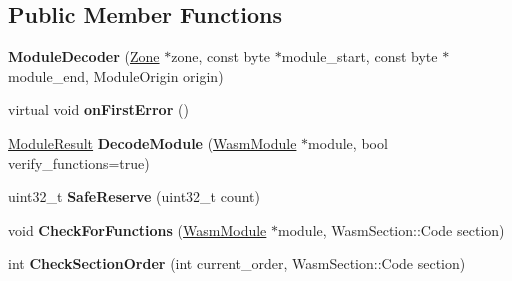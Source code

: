 \subsection*{Public Member Functions}
\begin{DoxyCompactItemize}
\item 
{\bfseries Module\+Decoder} (\hyperlink{classv8_1_1internal_1_1_zone}{Zone} $\ast$zone, const byte $\ast$module\+\_\+start, const byte $\ast$module\+\_\+end, Module\+Origin origin)\hypertarget{classv8_1_1internal_1_1wasm_1_1_module_decoder_aed4f8b1010871b48585bbaae846f55d2}{}\label{classv8_1_1internal_1_1wasm_1_1_module_decoder_aed4f8b1010871b48585bbaae846f55d2}

\item 
virtual void {\bfseries on\+First\+Error} ()\hypertarget{classv8_1_1internal_1_1wasm_1_1_module_decoder_a903485aca0a570104d4681b8f0e399e4}{}\label{classv8_1_1internal_1_1wasm_1_1_module_decoder_a903485aca0a570104d4681b8f0e399e4}

\item 
\hyperlink{structv8_1_1internal_1_1wasm_1_1_result}{Module\+Result} {\bfseries Decode\+Module} (\hyperlink{structv8_1_1internal_1_1wasm_1_1_wasm_module}{Wasm\+Module} $\ast$module, bool verify\+\_\+functions=true)\hypertarget{classv8_1_1internal_1_1wasm_1_1_module_decoder_a485ed6e18046df2b9b579e719da7d6d8}{}\label{classv8_1_1internal_1_1wasm_1_1_module_decoder_a485ed6e18046df2b9b579e719da7d6d8}

\item 
uint32\+\_\+t {\bfseries Safe\+Reserve} (uint32\+\_\+t count)\hypertarget{classv8_1_1internal_1_1wasm_1_1_module_decoder_ab570f953e245fd5d21516d262830054e}{}\label{classv8_1_1internal_1_1wasm_1_1_module_decoder_ab570f953e245fd5d21516d262830054e}

\item 
void {\bfseries Check\+For\+Functions} (\hyperlink{structv8_1_1internal_1_1wasm_1_1_wasm_module}{Wasm\+Module} $\ast$module, Wasm\+Section\+::\+Code section)\hypertarget{classv8_1_1internal_1_1wasm_1_1_module_decoder_a95eade55409408cb8ebece85e139d70d}{}\label{classv8_1_1internal_1_1wasm_1_1_module_decoder_a95eade55409408cb8ebece85e139d70d}

\item 
int {\bfseries Check\+Section\+Order} (int current\+\_\+order, Wasm\+Section\+::\+Code section)\hypertarget{classv8_1_1internal_1_1wasm_1_1_module_decoder_a7a41478cb8165167c76d24852978bcb3}{}\label{classv8_1_1internal_1_1wasm_1_1_module_decoder_a7a41478cb8165167c76d24852978bcb3}


\end{DoxyCompactItemize}
